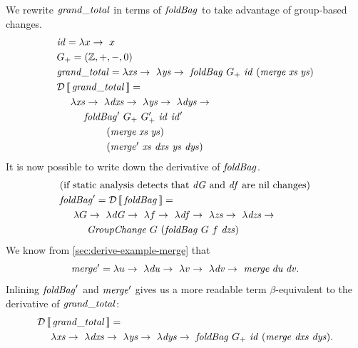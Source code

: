 We rewrite $\mathit{grand\_total}$ in terms of $\mathit{foldBag}$ to take advantage of
group-based changes.
{\DeriveProgramEnv
\begin{align*}
&\Term{id}=\Lam{x}{x}\\
&G_+ = (\mathbb Z, +, -, 0)\\
&\Program = \Lam{\Xs}{\Lam{\Ys}{\FOLDBAG~G_+~\Term{id}~(\Merge\Xs\Ys)}}\\
&\Derive\Program=\\
&\zero
\Lam{\Xs}{\Lam{\DXs}{}}\Lam{\Ys}{\Lam{\DYs}{}}\\
&\one
\FOLDBAG'~G_+~G_+'~\Term{id}~\Term{id}'\\
&\two
(\Merge\Xs\Ys)\\
&\two
(\MERGE'~\Xs~\DXs~\Ys~\DYs)
\end{align*}
}%
It is now possible to write down the derivative of $\mathit{foldBag}$.
{\DeriveProgramEnv
\begin{align*}
&\text{(if static analysis detects that $\D G$ and $\D f$
are nil changes)}\\
&\FOLDBAG'=\Derive{\FOLDBAG}=\\
&\zero
\Lam{G}{\Lam{\D G}{\Lam{f}{\Lam{\D f}{
\Lam{\Zs}{\Lam{\DZs}{}}}}}}\\
&\one
\Term{GroupChange}~G~
(\FOLDBAG~G~f~\DZs)
\end{align*}
}%
We know from \cref{sec:derive-example-merge} that
\[
\MERGE'=\Lam{u}{\Lam{\D u}{\Lam{v}{\Lam{\D v}{\Merge{\D u}{\D v}}}}}.
\]
Inlining $\mathit{foldBag}'$ and $\mathit{merge}'$ gives us a more readable term
$\beta$-equivalent to the derivative of $\mathit{grand\_total}$:
{\DeriveProgramEnv
\begin{align*}
&\Derive\Program=\\
&\zero
\Lam{\Xs}{\Lam{\DXs}{}}\Lam{\Ys}{\Lam{\DYs}{}}
%
\FOLDBAG~G_+~\Term{id}~
(\MERGE~\DXs~\DYs).
\end{align*}
}%

